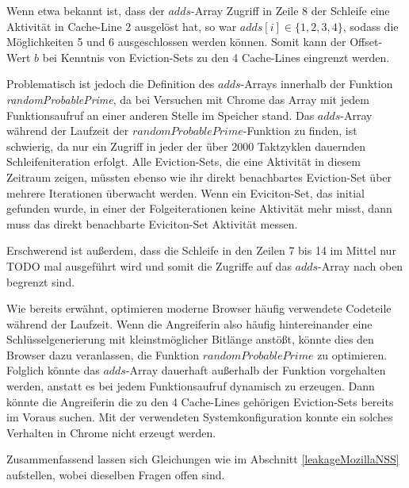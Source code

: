 Wenn etwa bekannt ist, dass der $adds$-Array Zugriff in Zeile 8 der Schleife eine Aktivität in Cache-Line 2 ausgelöst hat, so war $adds[i] \in \{1,2,3,4\}$, sodass die Möglichkeiten 5 und 6 ausgeschlossen werden können.
Somit kann der Offset-Wert $b$ bei Kenntnis von Eviction-Sets zu den 4 Cache-Lines eingrenzt werden.

Problematisch ist jedoch die Definition des $adds$-Arrays innerhalb der Funktion \textit{randomProbablePrime}, da bei Versuchen mit Chrome das Array mit jedem Funktionsaufruf an einer anderen Stelle im Speicher stand.
Das $adds$-Array während der Laufzeit der $randomProbablePrime$-Funktion zu finden, ist schwierig, da nur ein Zugriff in jeder der über 2000 Taktzyklen dauernden Schleifeniteration erfolgt.
Alle Eviction-Sets, die eine Aktivität in diesem Zeitraum zeigen, müssten ebenso wie ihr direkt benachbartes Eviction-Set über mehrere Iterationen überwacht werden.
Wenn ein Eviciton-Set, das initial gefunden wurde, in einer der Folgeiterationen keine Aktivität mehr misst, dann muss das direkt benachbarte Eviciton-Set Aktivität messen.

Erschwerend ist außerdem, dass die Schleife in den Zeilen 7 bis 14 im Mittel nur TODO mal ausgeführt wird und somit die Zugriffe auf das $adds$-Array nach oben begrenzt sind.

Wie bereits erwähnt, optimieren moderne Browser häufig verwendete Codeteile während der Laufzeit.
Wenn die Angreiferin also häufig hintereinander eine Schlüsselgenerierung mit kleinstmöglicher Bitlänge anstößt, könnte dies den Browser dazu veranlassen, die Funktion $randomProbablePrime$ zu optimieren. 
Folglich könnte das $adds$-Array dauerhaft außerhalb der Funktion vorgehalten werden, anstatt es bei jedem Funktionsaufruf dynamisch zu erzeugen.
Dann könnte die Angreiferin die zu den 4 Cache-Lines gehörigen Eviction-Sets bereits im Voraus suchen.
Mit der verwendeten Systemkonfiguration konnte ein solches Verhalten in Chrome nicht erzeugt werden.

Zusammenfassend lassen sich Gleichungen wie im Abschnitt \ref{leakageMozillaNSS} aufstellen, wobei dieselben Fragen offen sind.



